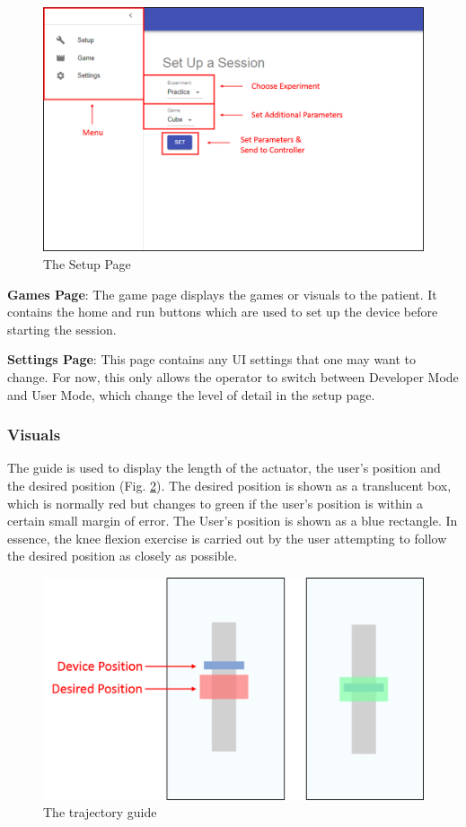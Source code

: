 \documentclass[12pt]{report}
\begin{document}
	\begin{figure}[h] 
		\centering
		\includegraphics[width=0.9\linewidth]{UI_menu_label}
		\caption{The Setup Page}
		\label{fig:ui-menu}
	\end{figure} 	
		
\textbf{Games Page}: The game page displays the games or visuals to the patient. It contains the home and run buttons which are used to set up the device before starting the session. 

\textbf{Settings Page}: This page contains any UI settings that one may want to change. For now, this only allows the operator to switch between Developer Mode and User Mode, which change the level of detail in the setup page. 		
		
		\subsubsection{Visuals}
		
		The guide is used to display the length of the actuator, the user's position and the desired position (Fig. \ref{fig:trajectory}). The desired position is shown as a translucent box, which is normally red but changes to green if the user's position is within a certain small margin of error. The User's position is shown as a blue rectangle. In essence, the knee flexion exercise is carried out by the user attempting to follow the desired position as closely as possible. 
		
	\begin{figure}[h] 
		\centering
		\includegraphics[width=0.75\linewidth]{UI_trajectory}
		\caption{The trajectory guide}
		\label{fig:trajectory}
	\end{figure} 
	
\end{document}
